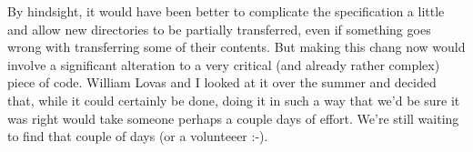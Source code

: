 \begin{itemize}
By hindsight, it would have been better to complicate the specification a
little and allow new directories to be partially transferred, even if
something goes wrong with transferring some of their contents.  But
making this chang now would involve a significant alteration to a very
critical (and already rather complex) piece of code.  William Lovas and I
looked at it over the summer and decided that, while it could certainly
be done, doing it in such a way that we'd be sure it was right would take
someone perhaps a couple days of effort.  We're still waiting to find
that couple of days (or a volunteeer :-).

\end{itemize}
